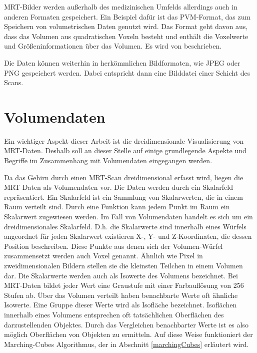 MRT-Bilder werden außerhalb des medizinischen Umfelds allerdings auch in anderen Formaten gespeichert. 
Ein Beispiel dafür ist das PVM-Format, das zum Speichern von volumetrischen Daten genutzt wird. Das Format geht davon aus, dass das Volumen aus quadratischen Voxeln besteht und enthält die Voxelwerte und Größeninformationen über das Volumen. Es wird von \cite{pvm} beschrieben.

Die Daten können weiterhin in herkömmlichen Bildformaten, wie JPEG oder PNG gespeichert werden. Dabei entspricht dann eine Bilddatei einer Schicht des Scans. 
 

\section{Volumendaten}
\label{volumeData}					  	  %

Ein wichtiger Aspekt dieser Arbeit ist die dreidimensionale Visualisierung von MRT-Daten. Deshalb soll an dieser Stelle auf einige grundlegende Aspekte und Begriffe im Zusammenhang mit Volumendaten eingegangen werden.

Da das Gehirn durch einen MRT-Scan dreidimensional erfasst wird, liegen die MRT-Daten als Volumendaten vor. Die Daten werden durch ein Skalarfeld repräsentiert. Ein Skalarfeld ist ein Sammlung von Skalarwerten, die in einem Raum verteilt sind. Durch eine Funktion kann jedem Punkt im Raum ein Skalarwert zugewiesen werden. Im Fall von Volumendaten handelt es sich um ein dreidimensionales Skalarfeld. D.h. die Skalarwerte sind innerhalb eines Würfels angeordnet für jeden Skalarwert existieren X-, Y- und Z-Koordinaten, die dessen Position beschreiben. 
Diese Punkte aus denen sich der Volumen-Würfel zusammensetzt werden auch Voxel genannt. Ähnlich wie Pixel in zweidimensionalen Bildern stellen sie die kleinsten Teilchen in einem Volumen dar. 
Die Skalarwerte werden auch als Isowerte des Volumens bezeichnet. Bei MRT-Daten bildet jeder Wert eine Graustufe mit einer Farbauflösung von 256 Stufen ab. 
Über das Volumen verteilt haben benachbarte Werte oft ähnliche Isowerte. Eine Gruppe dieser Werte wird als Isofläche bezeichnet. Isoflächen innerhalb eines Volumens entsprechen oft tatsächlichen Oberflächen des darzustellenden Objektes. Durch das Vergleichen benachbarter Werte ist es also möglich Oberflächen von Objekten zu ermitteln. Auf diese Weise funktioniert der Marching-Cubes Algorithmus, der in Abschnitt \ref{marchingCubes} erläutert wird. 


